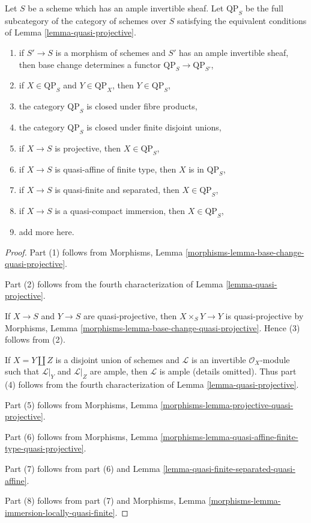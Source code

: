 \begin{lemma}
\label{lemma-category-quasi-projective}
Let $S$ be a scheme which has an ample invertible sheaf.
Let $\text{QP}_S$ be the full subcategory of the
category of schemes over $S$ satisfying the equivalent
conditions of Lemma \ref{lemma-quasi-projective}.
\begin{enumerate}
\item if $S' \to S$ is a morphism of schemes and $S'$ has
an ample invertible sheaf, then base change determines
a functor $\text{QP}_S \to \text{QP}_{S'}$,
\item if $X \in \text{QP}_S$ and $Y \in \text{QP}_X$, then $Y \in \text{QP}_S$,
\item the category $\text{QP}_S$ is closed under fibre products,
\item the category $\text{QP}_S$ is closed under
finite disjoint unions,
\item if $X \to S$ is projective, then $X \in \text{QP}_S$,
\item if $X \to S$ is quasi-affine of finite type, then
$X$ is in $\text{QP}_S$,
\item if $X \to S$ is quasi-finite and separated, then
$X \in \text{QP}_S$,
\item if $X \to S$ is a quasi-compact immersion, then
$X \in \text{QP}_S$,
\item add more here.
\end{enumerate}
\end{lemma}

\begin{proof}
Part (1) follows from Morphisms, Lemma
\ref{morphisms-lemma-base-change-quasi-projective}.

\medskip\noindent
Part (2) follows from the fourth characterization of
Lemma \ref{lemma-quasi-projective}.

\medskip\noindent
If $X \to S$ and $Y \to S$ are quasi-projective, then
$X \times_S Y \to Y$ is quasi-projective by
Morphisms, Lemma \ref{morphisms-lemma-base-change-quasi-projective}.
Hence (3) follows from (2).

\medskip\noindent
If $X = Y \amalg Z$ is a disjoint union of schemes
and $\mathcal{L}$ is an invertible $\mathcal{O}_X$-module
such that $\mathcal{L}|_Y$ and $\mathcal{L}|_Z$ are ample, then
$\mathcal{L}$ is ample (details omitted). Thus
part (4) follows from the fourth characterization of
Lemma \ref{lemma-quasi-projective}.

\medskip\noindent
Part (5) follows from
Morphisms, Lemma \ref{morphisms-lemma-projective-quasi-projective}.

\medskip\noindent
Part (6) follows from
Morphisms, Lemma
\ref{morphisms-lemma-quasi-affine-finite-type-quasi-projective}.

\medskip\noindent
Part (7) follows from part (6) and
Lemma \ref{lemma-quasi-finite-separated-quasi-affine}.

\medskip\noindent
Part (8) follows from part (7) and
Morphisms, Lemma \ref{morphisms-lemma-immersion-locally-quasi-finite}.
\end{proof}










